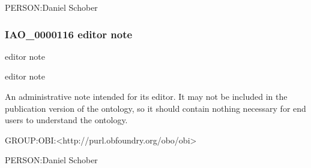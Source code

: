 \documentclass[letterpaper,10pt,english]{sphinxmanual}
\begin{document}
\begin{sphinxShadowBox}

\sphinxAtStartPar
PERSON:Daniel Schober
\end{sphinxShadowBox}
\begin{quote}

\ignorespaces \end{quote}


\subsubsection{IAO\_0000116 \sphinxhyphen{} editor note}
\label{\detokenize{doc-IAO_0000116:iao-0000116-editor-note}}\label{\detokenize{doc-IAO_0000116:index-0}}\label{\detokenize{doc-IAO_0000116::doc}}
\begin{sphinxShadowBox}

\sphinxAtStartPar
editor note
\end{sphinxShadowBox}

\begin{sphinxShadowBox}

\sphinxAtStartPar
editor note
\end{sphinxShadowBox}

\begin{sphinxShadowBox}

\sphinxAtStartPar
An administrative note intended for its editor. It may not be included in the publication version of the ontology, so it should contain nothing necessary for end users to understand the ontology.
\end{sphinxShadowBox}

\begin{sphinxShadowBox}

\sphinxAtStartPar
GROUP:OBI:\textless{}http://purl.obfoundry.org/obo/obi\textgreater{}
\end{sphinxShadowBox}

\begin{sphinxShadowBox}

\sphinxAtStartPar
PERSON:Daniel Schober
\end{sphinxShadowBox}
\begin{quote}

\ignorespaces \end{quote}
\end{document}
